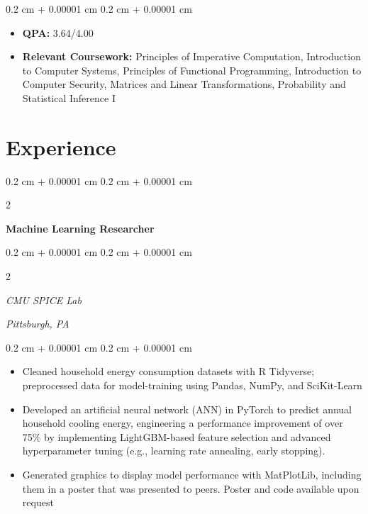 \documentclass[10pt, letterpaper]{article}
\newenvironment{highlights}{
    \begin{itemize}[
        topsep=0.10 cm,
        parsep=0.10 cm,
        partopsep=0pt,
        itemsep=0pt,
        leftmargin=0.4 cm + 10pt
    ]
}{
    \end{itemize}
} %
\newenvironment{onecolentry}{
    \begin{adjustwidth}{
        0.2 cm + 0.00001 cm
    }{
        0.2 cm + 0.00001 cm
    }
}{
    \end{adjustwidth}
} %
\newenvironment{twocolentry}[2][]{
    \onecolentry
    \def\secondColumn{#2}
    \setcolumnwidth{\fill, 4.5 cm}
    \begin{paracol}{2}
}{
    \switchcolumn \raggedleft \secondColumn
    \end{paracol}
    \endonecolentry
} %
\begin{document}
        \vspace{0.10 cm}
        \begin{onecolentry}
            \begin{highlights}
                \item \textbf{QPA:} 3.64/4.00 
                \item \textbf{Relevant Coursework:} Principles of Imperative Computation, Introduction to Computer Systems, Principles of Functional Programming, Introduction to Computer Security, Matrices and Linear Transformations, Probability and Statistical Inference I
            \end{highlights}
        \end{onecolentry}
    
    \section{Experience}

        \begin{twocolentry}{
        }
            \textbf{Machine Learning Researcher}
        \end{twocolentry}
        \begin{twocolentry}{
            \textit{Pittsburgh, PA}}
        \textit{CMU SPICE Lab}
        \end{twocolentry}

        \vspace{0.10 cm}
        \begin{onecolentry}
            \begin{highlights}
                \item Cleaned household energy consumption datasets with R Tidyverse; preprocessed data for model-training using Pandas, NumPy, and SciKit-Learn
                \item Developed an artificial neural network (ANN) in PyTorch to predict annual household cooling energy, engineering a performance improvement of over 75\% by implementing LightGBM-based feature selection and advanced hyperparameter tuning (e.g., learning rate annealing, early stopping).
                \item Generated graphics to display model performance with MatPlotLib, including them in a poster that was presented to peers. Poster and code available upon request
            \end{highlights}
        \end{onecolentry}
\end{document}
